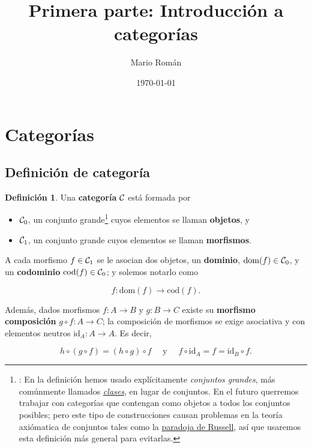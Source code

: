\documentclass[11pt]{article}
\author{Mario Román}
\date{\today}
\title{Primera parte: Introducción a categorías}
\theoremstyle{plain}
\theoremstyle{definition}
\newtheorem{definition}{Definición}
\theoremstyle{remark}
\begin{document}
\maketitle
\tableofcontents

\section{Categorías}
\label{sec:org36fe67c}
\subsection{Definición de categoría}
\label{sec:org84856c2}
\begin{definition}
Una \textbf{categoría} \({\cal C}\) está formada por \cite{brauer17} \cite{aluffi09_prelim}

\begin{itemize}
\item \({\cal C}_0\), un conjunto grande\footnote{: En la definición hemos usado explícitamente \emph{conjuntos grandes}, más
comúnmente llamados \emph{\href{https://es.wikipedia.org/wiki/Clase\_(teoría\_de\_conjuntos)}{clases}}, en lugar de conjuntos. En el futuro
querremos trabajar con categorías que contengan como objetos a todos
los conjuntos posibles; pero este tipo de construcciones causan problemas
en la teoría axiómatica de conjuntos tales como la 
\href{https://es.wikipedia.org/wiki/Paradoja\_de\_Russell}{paradoja de Russell}, así que usaremos esta definición más general para 
evitarlas.} cuyos elementos se llaman \textbf{objetos}, y
\item \({\cal C}_1\), un conjunto grande cuyos elementos se llaman \textbf{morfismos}.
\end{itemize}

A cada morfismo \(f \in {\cal C}_1\) se le asocian dos objetos, un \textbf{dominio}, \(\mathrm{dom}(f) \in {\cal C}_0\), 
y un \textbf{codominio} \(\mathrm{cod}(f) \in {\cal C}_0\); y solemos notarlo como

\[
f \colon \mathrm{dom}(f) \to \mathrm{cod}(f).
\]

Además, dados morfismos \(f \colon A \to B\) y \(g \colon B \to C\) existe su \textbf{morfismo composición}
\(g \circ f \colon A \to C\); la composición de morfismos se exige asociativa y con elementos
neutros \(\mathrm{id}_{A}\colon A \to A\). Es decir,

\[
h \circ (g \circ f) = (h \circ g) \circ f
\quad\text{ y }\quad
f \circ \mathrm{id}_A = f = \mathrm{id}_B \circ f.
\]
\end{definition}
\end{document}
